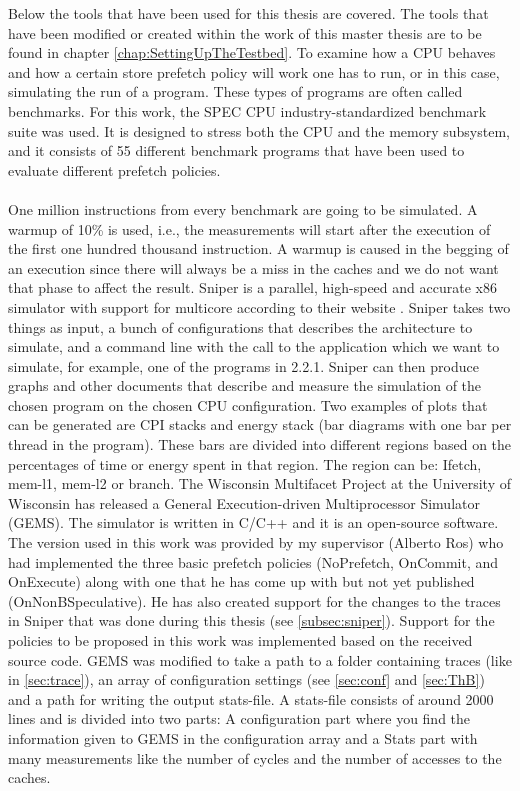 Below the tools that have been used for this thesis are
covered. The tools that have been modified or created within the work of this master thesis
are to be found in chapter \ref{chap:SettingUpTheTestbed}.
To examine how a CPU behaves and how a certain store prefetch policy will work
one has to run, or in this case, simulating the run of a program. These types of programs are often called
benchmarks. For this work, the SPEC CPU  industry-standardized benchmark
suite \cite{specCpu} was used. It is designed to stress both the CPU and the memory subsystem, and it consists of 55 different benchmark programs that have been used to evaluate
different prefetch policies.
\\ \\
One million instructions from every benchmark are going to be simulated. A warmup of 10\% is used, i.e., the measurements will start after the execution of the first one hundred thousand instruction. A warmup is caused in the begging of an execution since there will always be a miss in the caches and we do not want that phase to affect the result.
Sniper is a parallel, high-speed and accurate x86 simulator with support for multicore
according to their website \cite{sniper}. Sniper takes two things as input, a bunch of configurations
that describes the architecture to simulate, and a command line with the call to
the application which we want to simulate, for example, one of the programs in 2.2.1.
Sniper can then produce graphs and other documents that describe and measure the
simulation of the chosen program on the chosen CPU configuration. Two examples of
plots that can be generated are CPI stacks \cite{cpi} and energy stack  (bar diagrams
with one bar per thread in the program). These bars are divided into different regions
based on the percentages of time or energy spent in that region. The region can be:
Ifetch, mem-l1, mem-l2 or branch.
The Wisconsin Multifacet Project at the University of Wisconsin has released a General
Execution-driven Multiprocessor Simulator (GEMS). The simulator is written in
C/C++ and it is an open-source software. The version used in this work was provided
by my supervisor (Alberto Ros) who had implemented the three basic prefetch
policies (NoPrefetch, OnCommit, and OnExecute) along with one that he has come
up with but not yet published (OnNonBSpeculative). He has also created support for the changes
to the traces in Sniper that was done during this thesis (see \ref{subsec:sniper}). Support for the
policies to be proposed in this work was implemented based on the received source
code.
GEMS was modified to take a path to a folder containing traces (like in \ref{sec:trace}), an array of configuration
settings (see \ref{sec:conf} and \ref{sec:ThB}) and a path for writing the output stats-file. A
stats-file consists of around 2000 lines and is divided into two parts: A configuration part where you find the information given to GEMS in the configuration array and
a Stats part with many measurements like the number of cycles and the number of
accesses to the caches.